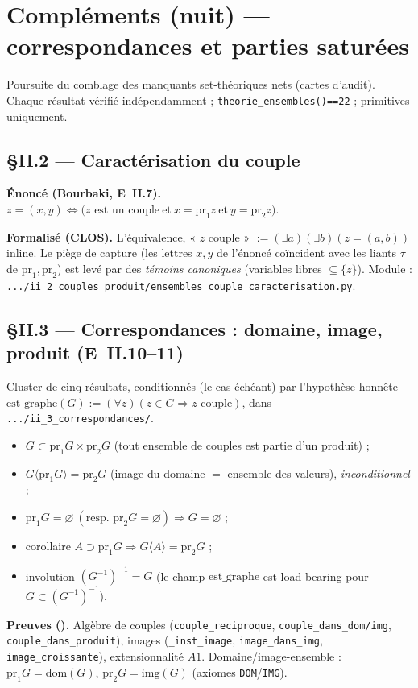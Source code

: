 \section{Compléments (nuit) --- correspondances et parties saturées}

Poursuite du comblage des manquants set-théoriques nets (cartes d'audit). Chaque
résultat vérifié indépendamment ; \texttt{theorie\_ensembles()==22} ; primitives
\Nstar{} uniquement.

\subsection{§II.2 --- Caractérisation du couple}
\textbf{Énoncé (Bourbaki, E~II.7).} $z=(x,y)\Leftrightarrow\bigl(z\text{ est un couple}
\ \text{et}\ x=\mathrm{pr}_1 z\ \text{et}\ y=\mathrm{pr}_2 z\bigr)$.

\textbf{Formalisé (CLOS).} L'équivalence, « $z$ couple » $:=(\exists a)(\exists b)(z=(a,b))$
inline. Le piège de capture (les lettres $x,y$ de l'énoncé coïncident avec les liants
$\tau$ de $\mathrm{pr}_1,\mathrm{pr}_2$) est levé par des \emph{témoins canoniques}
(variables libres $\subseteq\{z\}$). Module : \texttt{.../ii\_2\_couples\_produit/ensembles\_couple\_caracterisation.py}.

\subsection{§II.3 --- Correspondances : domaine, image, produit (E~II.10--11)}
Cluster de cinq résultats, conditionnés (le cas échéant) par l'hypothèse honnête
$\mathrm{est\_graphe}(G):=(\forall z)(z\in G\Rightarrow z\text{ couple})$, dans
\texttt{.../ii\_3\_correspondances/}.
\begin{itemize}
  \item $G\subset \mathrm{pr}_1G\times\mathrm{pr}_2G$ (tout ensemble de couples est partie d'un produit) ;
  \item $G\langle\mathrm{pr}_1G\rangle=\mathrm{pr}_2G$ (image du domaine $=$ ensemble des valeurs), \emph{inconditionnel} ;
  \item $\mathrm{pr}_1G=\varnothing\ (\text{resp. }\mathrm{pr}_2G=\varnothing)\Rightarrow G=\varnothing$ ;
  \item corollaire $A\supset\mathrm{pr}_1G\Rightarrow G\langle A\rangle=\mathrm{pr}_2G$ ;
  \item involution $(G^{-1})^{-1}=G$ (le champ $\mathrm{est\_graphe}$ est load-bearing
        pour $G\subset(G^{-1})^{-1}$).
\end{itemize}
\textbf{Preuves (\Nstar).} Algèbre de couples (\texttt{couple\_reciproque},
\texttt{couple\_dans\_dom/img}, \texttt{couple\_dans\_produit}), images
(\texttt{\_inst\_image}, \texttt{image\_dans\_img}, \texttt{image\_croissante}),
extensionnalité $A1$. Domaine/image-ensemble : $\mathrm{pr}_1G=\mathrm{dom}(G)$,
$\mathrm{pr}_2G=\mathrm{img}(G)$ (axiomes \texttt{DOM}/\texttt{IMG}).

